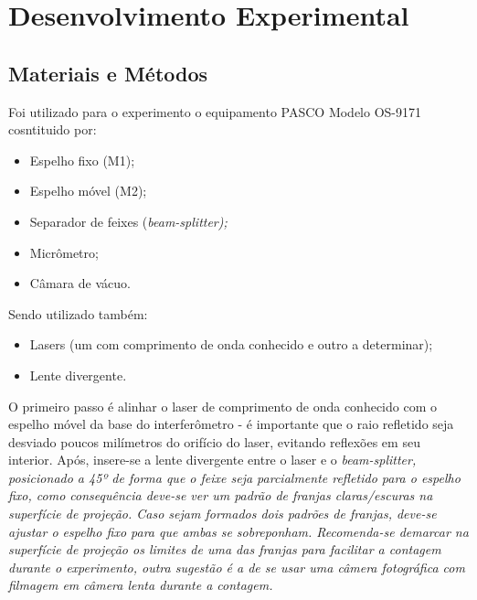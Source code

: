 \section{Desenvolvimento Experimental}
\subsection{Materiais e Métodos}
Foi utilizado para o experimento o equipamento PASCO Modelo OS-9171 cosntituido por: 
\begin{itemize}
	\item Espelho fixo (M1);
	\item Espelho móvel (M2);
	\item Separador de feixes (\it{beam-splitter});
	\item Micrômetro;
	\item Câmara de vácuo.
\end{itemize}
Sendo utilizado também:
\begin{itemize}
	\item Lasers (um com comprimento de onda conhecido e outro a determinar);
	\item Lente divergente.
\end{itemize}

    O primeiro passo é alinhar o laser de comprimento de onda conhecido com o espelho móvel da base do interferômetro - é importante que o raio refletido seja desviado poucos milímetros do orifício do laser, evitando reflexões em seu interior. Após, insere-se a lente divergente entre o laser e o \it{beam-splitter}, posicionado a 45º de forma que o feixe seja parcialmente refletido para o espelho fixo, como consequência deve-se ver um padrão de franjas claras/escuras na superfície de projeção. Caso sejam formados dois padrões de franjas, deve-se ajustar o espelho fixo para que ambas se sobreponham. 
    Recomenda-se demarcar na superfície de projeção os limites de uma das franjas para facilitar a contagem durante o experimento, outra sugestão é a de se usar uma câmera fotográfica com filmagem em câmera lenta durante a contagem. 
    
